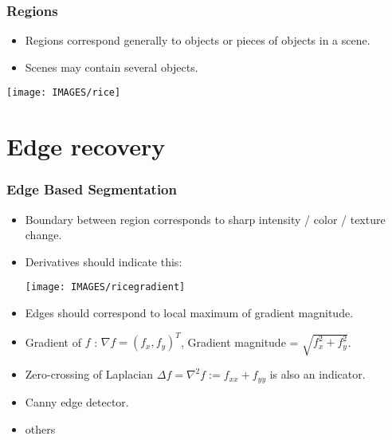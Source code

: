 \documentclass[9pt]{beamer}
\begin{document}


\begin{frame}
  \frametitle{Regions}
  \begin{itemize}
  \item Regions correspond generally to objects or pieces of objects in a scene. 
  \item Scenes may contain several objects.
  \end{itemize}
  \begin{center}
    \texttt{[image: IMAGES/rice]}
 \end{center}
\end{frame}



\section{Edge recovery}


\begin{frame}
  \frametitle{Edge Based Segmentation}
  \begin{itemize}
  \item Boundary between region corresponds to sharp intensity / color / texture change.
  \item Derivatives should indicate this:
    \begin{center}
      \texttt{[image: IMAGES/ricegradient]}
    \end{center}
  \item Edges should correspond to local maximum of gradient magnitude.
  \item Gradient of $f$ : $\nabla f = (f_x,f_y)^T$, Gradient magnitude = $\sqrt{f_x^2 + f_y^2}$.
  \item Zero-crossing of Laplacian $\Delta f = \nabla^2 f := f_{xx} + f_{yy}$ is also an indicator.
  \item Canny edge detector.
\item others
  \end{itemize} 
  
\end{frame}
\end{document}
